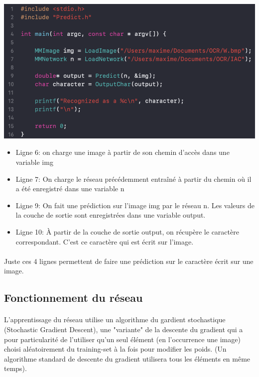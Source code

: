 \documentclass{article}
\begin{document}
\begin{center}
	\includegraphics[scale=0.8]{maxime1}
\end{center}


\begin{itemize}
	\item Ligne 6: on charge une image à partir de son chemin d'accès dans une variable img
	\item Ligne 7: On charge le réseau précédemment entraîné à partir du chemin où il a été enregistré dans une variable n
	\item Ligne 9: On fait une prédiction sur l'image img par le réseau n. Les valeurs de la couche de sortie sont enregistrées dans une variable output.
	\item Ligne 10: À partir de la couche de sortie output, on récupère le caractère correspondant. C'est ce caractère qui est écrit sur l'image.
\end{itemize}

\paragraph{}Juste ces 4 lignes permettent de faire une prédiction sur le caractère écrit sur une image.

\newpage

\subsection{Fonctionnement du réseau}

\paragraph{}L'apprentissage du réseau utilise un algorithme du gardient stochastique (Stochastic Gradient Descent), une "variante" de la descente du gradient qui a pour particularité de l'utiliser qu'un seul élément (en l'occurrence une image) choisi aléatoirement du training-set à la fois pour modifier les poids. (Un algorithme standard de descente du gradient utilisera tous les éléments en même temps).
\end{document}
